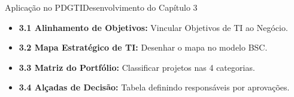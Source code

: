 \begin{senaiframe}{Aplicação no PDGTI}{Desenvolvimento do Capítulo 3}
  \vspace{0.5cm}
  \begin{tcolorbox}[senaigreencard, title={Capítulo 3 – Objetivos Estratégicos \& Mapa Estratégico}]
    \begin{itemize}
      \item \textbf{3.1 Alinhamento de Objetivos:} Vincular Objetivos de TI ao Negócio.
      \item \textbf{3.2 Mapa Estratégico de TI:} Desenhar o mapa no modelo BSC.
      \item \textbf{3.3 Matriz do Portfólio:} Classificar projetos nas 4 categorias.
      \item \textbf{3.4 Alçadas de Decisão:} Tabela definindo responsáveis por aprovações.
    \end{itemize}
  \end{tcolorbox}
\end{senaiframe}

